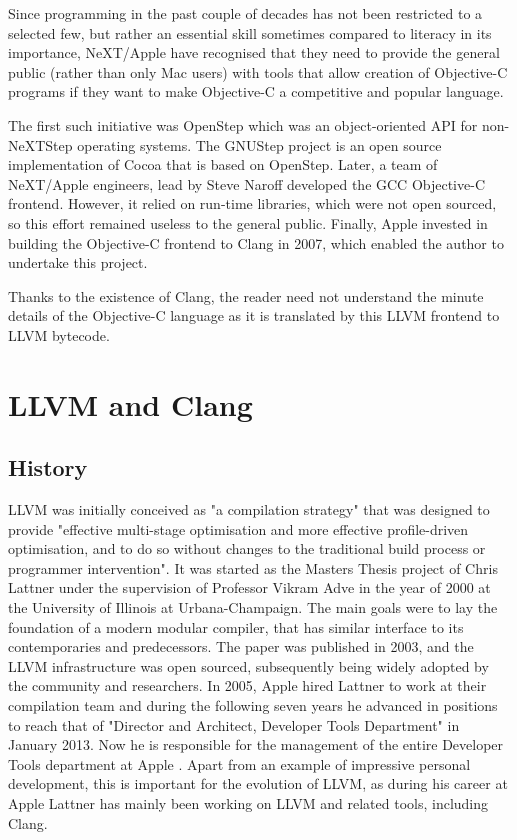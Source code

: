 \documentclass[parskip]{cs4rep}
\begin{document}
Since programming in the past couple of decades has not been restricted to a selected few, but rather an essential skill sometimes compared to literacy in its importance, NeXT/Apple have recognised that they need to provide the general public (rather than only Mac users) with tools that allow creation of Objective-C programs if they want to make Objective-C a competitive and popular language.

The first such initiative was OpenStep which was an object-oriented API for non-NeXTStep operating systems. The GNUStep project is an open source implementation of Cocoa that is based on OpenStep. Later, a team of NeXT/Apple engineers, lead by Steve Naroff developed the GCC Objective-C frontend. However, it relied on run-time libraries, which were not open sourced, so this effort remained useless to the general public. Finally, Apple invested in building the Objective-C frontend to Clang in 2007, which enabled the author to undertake this project.

Thanks to the existence of Clang, the reader need not understand the minute details of the Objective-C language as it is translated by this LLVM frontend to LLVM bytecode.

\section{LLVM and Clang}

\subsection{History}

LLVM was initially conceived as "a compilation strategy" that was designed to provide "effective multi-stage optimisation and more effective profile-driven optimisation, and to do so without changes to the traditional build process or programmer intervention"\cite{Lattner2002}. It was started as the Masters Thesis project of Chris Lattner under the supervision of Professor Vikram Adve in the year of 2000 at the University of Illinois at Urbana-Champaign. The main goals were to lay the foundation of a modern modular compiler, that has similar interface to its contemporaries and predecessors. The paper was published in 2003, and the LLVM infrastructure was open sourced, subsequently being widely adopted by the community and researchers\cite{Lattner}. In 2005, Apple hired Lattner to work at their compilation team and during the following seven years he advanced in positions to reach that of "Director and Architect, Developer Tools Department" in January 2013. Now he is responsible for the management of the entire Developer Tools department at Apple \cite{LattnerResume}. Apart from an example of impressive personal development, this is important for the evolution of LLVM, as during his career at Apple Lattner has mainly been working on LLVM and related tools, including Clang.
\end{document}
